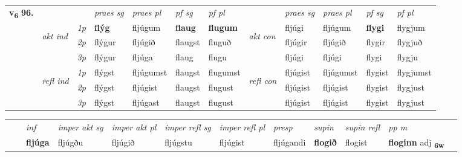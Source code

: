 \begin{tabular}{llllllllllll} \toprule
\multirow{4}{*}{{{\textbf{v{\textsubscript{6}}} \Large{\textbf{96.}}}}}  & &   &  \textit{praes sg}  & \textit{praes pl}  &\textit{ pf sg} & \textit{pf pl} &  &  \textit{praes sg}  & \textit{praes pl}  & \textit{pf sg} & \textit{pf pl } \\*
	\cmidrule{4-7} \cmidrule{9-12}
 & \multirow{3}{*}{\begin{turn}{90}\textit{akt ind}\end{turn}} & {\textit{1p}} & \textbf{flýg} & fljúgum    & \textbf{flaug} & \textbf{flugum} & \multirow{3}{*}{\begin{turn}{90}\textit{akt con}\end{turn}} &fljúgi & fljúgum & \textbf{flygi} & flygjum\\*
& &  {\textit{2p}} &  flýgur  & fljúgið   & flaugst & fluguð & & fljúgir & fljúgið & flygir & flygjuð \\*
& &  {\textit{3p}} & flýgur & fljúga   & flaug & flugu & & fljúgi & fljúgi& flygi & flygju  \\*
\cmidrule{4-7} \cmidrule{9-12}
 &\multirow{3}{*}{\begin{turn}{90}\textit{refl ind}\end{turn}} & {\textit{1p}} & flýgst & fljúgumst    & flaugst & flugumst & \multirow{3}{*}{\begin{turn}{90}\textit{refl con}\end{turn}}  &fljúgist & fljúgumst & flygist & flygjumst\\*
 &&  {\textit{2p}} &  flýgst  & fljúgist   & flaugst & flugust & &fljúgist & fljúgist & flygist & flygjust \\*
& &  {\textit{3p}} & flýgst & fljúgast   & flaugst & flugust & & fljúgist & fljúgist& flygist & flygjust  \\*
\cmidrule{4-7} \cmidrule{9-12}
\end{tabular}


\begin{tabular}{llllllllllll}
 & & \textit{inf} & \textit{imper akt sg} & \textit{imper akt pl} & \textit{imper refl sg} & \textit{imper refl pl} & \textit{presp} & \textit{supin} & \textit{supin refl} & \textit{pp m}     \\*
  & & \textbf{fljúga} & fljúgðu  & fljúgið & fljúgstu & fljúgist & fljúgandi &  \textbf{flogið} & flogist & \textbf{floginn} adj \textbf{\textsubscript{6w}} \\*
\cmidrule{1-12}
\end{tabular}



